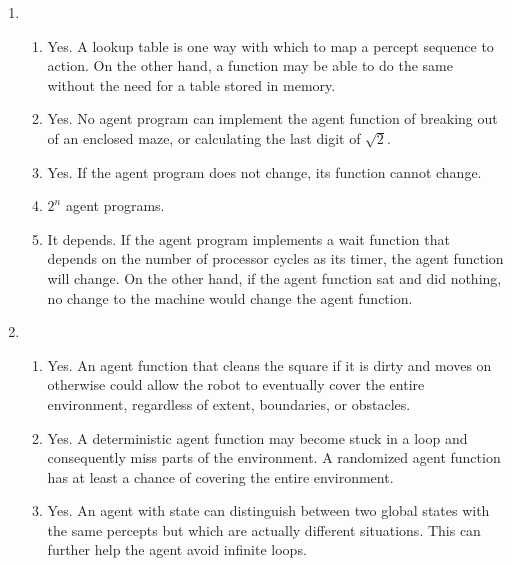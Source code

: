 \documentclass[10pt,letterpaper]{article}
\begin{document}
\begin{enumerate}
	\item
		\begin{enumerate}
			\item Yes. A lookup table is one way with which to map a percept
				sequence to action. On the other hand, a function may be able
				to do the same without the need for a table stored in memory.
			\item Yes. No agent program can implement the agent function of
				breaking out of an enclosed maze, or calculating the last digit
				of $\sqrt{2}$.
			\item Yes. If the agent program does not change, its function
				cannot change.
			\item $2^n$ agent programs.
			\item It depends. If the agent program implements a wait function
				that depends on the number of processor cycles as its timer,
				the agent function will change. On the other hand, if the agent
				function sat and did nothing, no change to the machine would
				change the agent function.
		\end{enumerate}

	\item
		\begin{enumerate}
			\item Yes. An agent function that cleans the square if it is dirty
				and moves on otherwise could allow the robot to eventually
				cover the entire environment, regardless of extent, boundaries,
				or obstacles.
			\item Yes. A deterministic agent function may become stuck in
				a loop and consequently miss parts of the environment.
				A randomized agent function has at least a chance of covering
				the entire environment.
			\item Yes. An agent with state can distinguish between two global
				states with the same percepts but which are actually different
				situations. This can further help the agent avoid infinite
				loops.
		\end{enumerate}
\end{enumerate}
\end{document}
